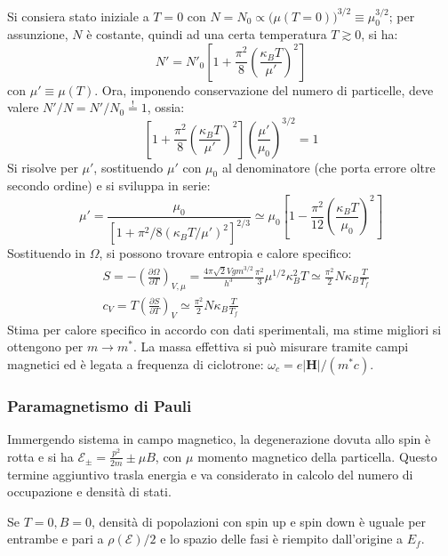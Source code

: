 \documentclass[10pt, a4paper]{scrartcl}
\numberwithin{equation}{subsection}
\theoremstyle{style1}
\begin{document}
Si consiera stato iniziale a $T=0$ con $N =  N_0 \propto \big(\mu (T=0)\big)^{ 3 / 2} \equiv \mu_0^{3 / 2} $; per assunzione, $N$ \`e costante, quindi ad una certa temperatura $T \gtrsim 0$, si ha:
\[
	N' = N'_0 \left[1 + \frac{\pi^2}{8} \left(\frac{\kappa _B T}{\mu' }\right)^2\right]
\] 
con $\mu ' \equiv \mu (T)$. Ora, imponendo conservazione del numero di particelle, deve valere $N' / N=N' / N_0 \stackrel{!}{=} 1$, ossia:
\[
\left[ 1+ \frac{\pi^2}{8}\left(\frac{\kappa _B T}{\mu '}\right) ^2 \right] \left(\frac{\mu '}{\mu_0 }\right) ^{3 / 2} =1
\] 
Si risolve per $\mu '$, sostituendo $\mu' $ con $\mu_0$ al denominatore (che porta errore oltre secondo ordine) e si sviluppa in serie:
\begin{equation}
\mu ' = \frac{\mu_0 }{\left[ 1 + \pi^2 / 8 (\kappa _B T / \mu ')^2 \right] ^{2 / 3} }\simeq \mu_0 \left[ 1 - \frac{\pi^2}{12} \left(\frac{\kappa _B T}{\mu_0 }\right) ^2 \right] 
\end{equation}
Sostituendo in $\Omega $, si possono trovare entropia e calore specifico:
\[
\begin{split}
	&S = -\left(\frac{\partial \Omega }{\partial T}\right)_{V,\mu }    = \frac{4 \pi \sqrt{2} V g m^{3 / 2} }{h^3}\frac{\pi^2 }{3}\mu ^{1 / 2} \kappa _B^2 T \simeq \frac{\pi^2}{2} N \kappa _B \frac{T}{T_f}\\
	&c_V = T \left(\frac{\partial S}{\partial T} \right) _V \simeq \frac{\pi^2}{ 2} N\kappa _B \frac{T}{T_f}
\end{split}
\] 
Stima per calore specifico in accordo con dati sperimentali, ma stime migliori si ottengono per $m\to m^*$. 
La massa effettiva si pu\`o misurare tramite campi magnetici ed \`e legata a frequenza di ciclotrone: $\omega_c = e \lvert \mathbf{H}  \rvert / (m^* c)$.

\subsubsection{Paramagnetismo di Pauli}

Immergendo sistema in campo magnetico, la degenerazione dovuta allo spin \`e rotta e si ha $\mathscr{E}_{\pm} = \frac{p^2}{2m} \pm \mu B$, con $\mu $ momento magnetico della particella.
Questo termine aggiuntivo trasla energia e va considerato in calcolo del numero di occupazione e densit\`a di stati.

Se $T= 0 , B=0$, densit\`a di popolazioni con spin up e spin down \`e uguale per entrambe e pari a $\rho (\mathscr{E}) / 2$ e lo spazio delle fasi \`e riempito dall'origine a $E_f$. 
\end{document}
